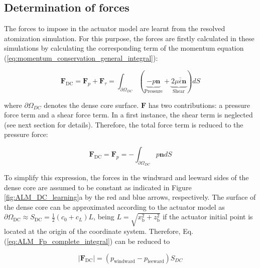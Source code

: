 \subsection{Determination of forces}
\label{subsec:ch4_ALM_forces_determination}

The forces to impose in the actuator model are learnt from the resolved atomization simulation. For this purpose, the forces are firstly calculated in these simulations by calculating the corresponding term of the momentum equation (\ref{eq:momentum_conservation_general_integral}):

\begin{equation}
\boldsymbol{F}_\mathrm{DC} = \boldsymbol{F}_p + \boldsymbol{F}_\tau = \int_{\partial \Omega_{DC}} \left( \underbrace{- p \boldsymbol{n}}_{\mathrm{Pressure}} + \underbrace{2 \mu \overline{\overline{\epsilon}} \boldsymbol{n}}_{\mathrm{Shear}}  \right) dS 
\end{equation}

where $\partial \Omega_{DC}$ denotes the dense core surface. $\boldsymbol{F} $ has two contributions: a pressure force term and a shear force term. In a first instance, the shear term is neglected (see next section for details). Therefore, the total force term is reduced to the pressure force:

\begin{equation}
\label{eq:ALM_Fp_complete_integral}
\boldsymbol{F}_\mathrm{DC} = \boldsymbol{F}_p = - \int_{\partial \Omega_{DC}} p \boldsymbol{n} dS 
\end{equation}

To simplify this expression, the forces in the windward and leeward sides of the dense core are assumed to be constant as indicated in Figure \ref{fig:ALM_DC_learning}a by the red and blue arrows, respectively. The surface of the dense core can be approximated according to the actuator model as $\partial \Omega_\mathrm{DC} \approx S_\mathrm{DC} = \frac{1}{2} \left( c_0 + c_L \right) L$, being $L = \sqrt{x_\mathrm{b}^2+z_\mathrm{b}^2}$ if the actuator initial point is located at the origin of the coordinate system. Therefore, Eq. (\ref{eq:ALM_Fp_complete_integral}) can be reduced to


\begin{equation}
\boxed{
|\boldsymbol{F}_\mathrm{DC}| = \left( p_\mathrm{windward} - p_\mathrm{leeward} \right) S_{DC} 
}
\end{equation}



